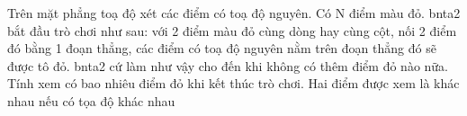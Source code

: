 Trên mặt phẳng toạ độ xét các điểm có toạ độ nguyên. Có N điểm màu đỏ. bnta2 bắt đầu trò chơi như sau: với 2 điểm màu đỏ cùng dòng hay cùng cột, nối 2 điểm đó bằng 1 đoạn thẳng, các điểm có toạ độ nguyên nằm trên đoạn thẳng đó sẽ được tô đỏ. bnta2 cứ làm như vậy cho đến khi không có thêm điểm đỏ nào nữa.   Tính xem có bao nhiêu điểm đỏ khi kết thúc trò chơi. Hai điểm được xem là khác nhau nếu có tọa độ khác nhau  

\